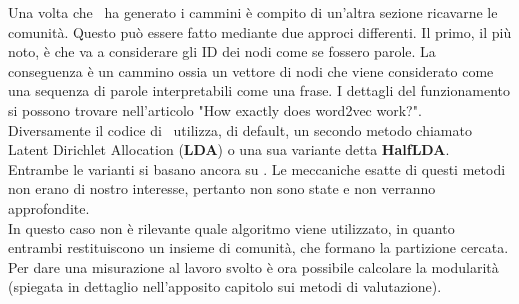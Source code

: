 %
Una volta che \nv\ ha generato i cammini è compito di un'altra sezione ricavarne le comunità. Questo può essere fatto mediante due approci differenti. Il primo, il più noto, è \textbf{\wv} che va a considerare gli ID dei nodi come se fossero parole. La conseguenza è un cammino ossia un vettore di nodi che viene considerato come una sequenza di parole interpretabili come una frase. I dettagli del funzionamento si possono trovare nell'articolo "How exactly does word2vec work?"\cite{W2V_paper}.\\
Diversamente il codice di \cnrl\ utilizza, di default, un secondo metodo chiamato Latent Dirichlet Allocation (\textbf{LDA})\cite{LDA} o una sua variante detta \textbf{HalfLDA}. Entrambe le varianti si basano ancora su \wv. Le meccaniche esatte di questi metodi non erano di nostro interesse, pertanto non sono state e non verranno approfondite.\\
In questo caso non è rilevante quale algoritmo viene utilizzato, in quanto entrambi restituiscono un insieme di comunità, che formano la partizione cercata. Per dare una misurazione al lavoro svolto è ora possibile calcolare la modularità (spiegata in dettaglio nell'apposito capitolo sui metodi di valutazione).
%
